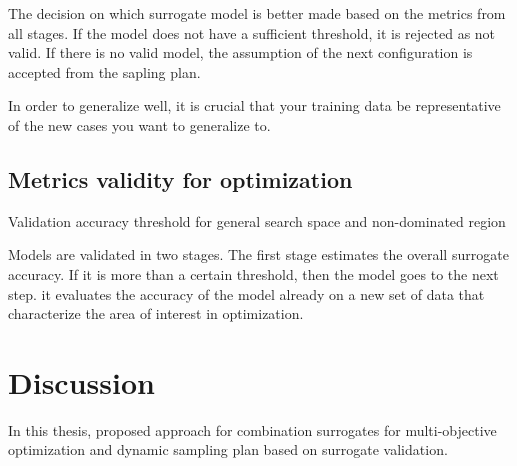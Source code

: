         The decision on which surrogate model is better made based on the metrics from all stages.  If the model does not have a sufficient threshold, it is rejected as not valid. If there is no valid model, the assumption of the next configuration is accepted from the sapling plan.

        In order to generalize well, it is crucial that your training data be representative of the new cases you want to generalize to.


        \subsection{Metrics validity for optimization}
        Validation accuracy threshold for general search space and non-dominated region

        Models are validated in two stages. The first stage estimates the overall surrogate accuracy. If it is more than a certain threshold, then the model goes to the next step. it evaluates the accuracy of the model already on a new set of data that characterize the area of interest in optimization.


    




    \section{Discussion}

        In this thesis, proposed approach for combination surrogates for multi-objective optimization and dynamic sampling plan based on surrogate validation.

